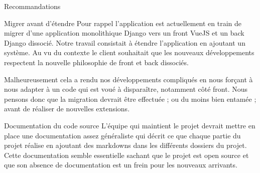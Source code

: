 \documentclass[]{article}
\begin{document}
{\begin{section}{Recommandations}
 \begin{subsection}{Migrer avant d'étendre}
     Pour rappel l'application est actuellement en train de migrer d'une application monolithique Django vers un front VueJS et un back Django dissocié. Notre travail consistait à étendre l'application en ajoutant un système. Au vu du contexte le client souhaitait que les nouveaux développements respectent la nouvelle philosophie de front et back dissociés.

     Malheureusement cela a rendu nos développements compliqués en nous forçant à nous adapter à un code qui est voué à disparaître, notamment côté front. Nous pensons donc que la migration devrait être effectuée ; ou du moins bien entamée ; avant de réaliser de nouvelles extensions.
 \end{subsection}

 \begin{subsection}{Documentation du code source}
     L'équipe qui maintient le projet devrait mettre en place une documentation assez généraliste qui décrit ce que chaque partie du projet réalise en ajoutant des markdowns dans les différents dossiers du projet. Cette documentation semble essentielle sachant que le projet est open source et que son absence de documentation est un frein pour les nouveaux arrivants.
 \end{subsection}
\end{section}

}
\end{document}

